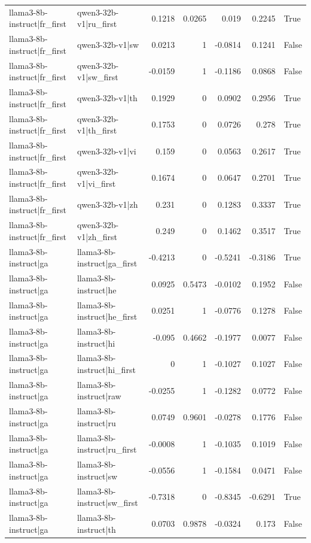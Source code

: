 \begin{table}
\begin{tabular}{l l r r r r l}
llama3-8b-instruct|fr_first & qwen3-32b-v1|ru_first & 0.1218 & 0.0265 & 0.019 & 0.2245 & True \\
llama3-8b-instruct|fr_first & qwen3-32b-v1|sw & 0.0213 & 1 & -0.0814 & 0.1241 & False \\
llama3-8b-instruct|fr_first & qwen3-32b-v1|sw_first & -0.0159 & 1 & -0.1186 & 0.0868 & False \\
llama3-8b-instruct|fr_first & qwen3-32b-v1|th & 0.1929 & 0 & 0.0902 & 0.2956 & True \\
llama3-8b-instruct|fr_first & qwen3-32b-v1|th_first & 0.1753 & 0 & 0.0726 & 0.278 & True \\
llama3-8b-instruct|fr_first & qwen3-32b-v1|vi & 0.159 & 0 & 0.0563 & 0.2617 & True \\
llama3-8b-instruct|fr_first & qwen3-32b-v1|vi_first & 0.1674 & 0 & 0.0647 & 0.2701 & True \\
llama3-8b-instruct|fr_first & qwen3-32b-v1|zh & 0.231 & 0 & 0.1283 & 0.3337 & True \\
llama3-8b-instruct|fr_first & qwen3-32b-v1|zh_first & 0.249 & 0 & 0.1462 & 0.3517 & True \\
llama3-8b-instruct|ga & llama3-8b-instruct|ga_first & -0.4213 & 0 & -0.5241 & -0.3186 & True \\
llama3-8b-instruct|ga & llama3-8b-instruct|he & 0.0925 & 0.5473 & -0.0102 & 0.1952 & False \\
llama3-8b-instruct|ga & llama3-8b-instruct|he_first & 0.0251 & 1 & -0.0776 & 0.1278 & False \\
llama3-8b-instruct|ga & llama3-8b-instruct|hi & -0.095 & 0.4662 & -0.1977 & 0.0077 & False \\
llama3-8b-instruct|ga & llama3-8b-instruct|hi_first & 0 & 1 & -0.1027 & 0.1027 & False \\
llama3-8b-instruct|ga & llama3-8b-instruct|raw & -0.0255 & 1 & -0.1282 & 0.0772 & False \\
llama3-8b-instruct|ga & llama3-8b-instruct|ru & 0.0749 & 0.9601 & -0.0278 & 0.1776 & False \\
llama3-8b-instruct|ga & llama3-8b-instruct|ru_first & -0.0008 & 1 & -0.1035 & 0.1019 & False \\
llama3-8b-instruct|ga & llama3-8b-instruct|sw & -0.0556 & 1 & -0.1584 & 0.0471 & False \\
llama3-8b-instruct|ga & llama3-8b-instruct|sw_first & -0.7318 & 0 & -0.8345 & -0.6291 & True \\
llama3-8b-instruct|ga & llama3-8b-instruct|th & 0.0703 & 0.9878 & -0.0324 & 0.173 & False \\

\end{tabular}
\end{table}
